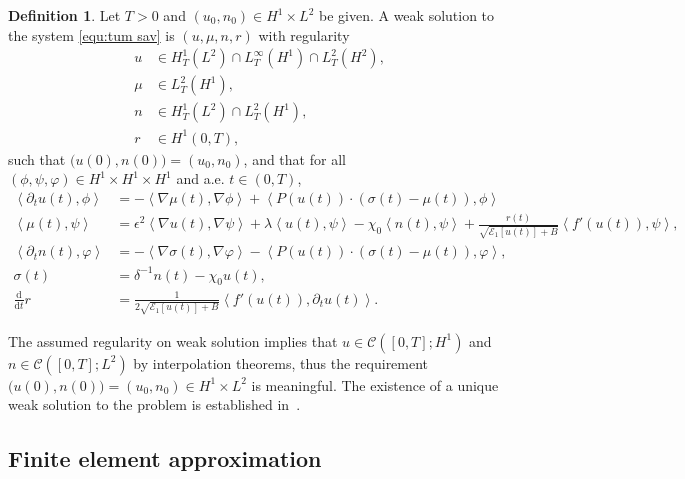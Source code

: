 \documentclass[11pt, reqno]{amsart}
\theoremstyle{definition}
\newtheorem{definition}[theorem]{Definition}
\numberwithin{equation}{section}
\newcommand{\ddt}{\frac{\mathrm{d}}{\mathrm{d}t}}
\newcommand{\inpro}[2]{\left\langle#1,#2\right\rangle}
\begin{document}
\begin{definition}\label{def:weak-solution}
Let $T>0$ and $(u_0,n_0)\in H^1\times L^2$ be given. A weak solution to the system \eqref{equ:tum sav} is $(u,\mu,n,r)$ with regularity
\begin{align*}
	u &\in H^1_T(L^2) \cap L^\infty_T(H^1) \cap L^2_T(H^2),
	\\
	\mu &\in L^2_T(H^1),
	\\
	n &\in H^1_T(L^2) \cap L^2_T(H^1),
	\\
	r &\in H^1(0,T),
\end{align*}
such that $\big(u(0),n(0)\big)=(u_0,n_0)$, and that for all $(\phi, \psi, \varphi) \in H^1\times H^1\times H^1$ and {a.e.} $t\in (0,T)$,
\begin{subequations}\label{equ:weak tum}
	\begin{alignat}{1}
		\label{equ:weak tum u}
		\inpro{\partial_t u(t)}{\phi}
		&=
		-\inpro{\nabla \mu(t)}{\nabla \phi}
		+
		\inpro{P(u(t))\cdot (\sigma(t) -\mu(t))}{\phi}
		\\
		\label{equ:weak tum mu}
		\inpro{\mu(t)}{\psi}
		&=
		\epsilon^2 \inpro{\nabla u(t)}{\nabla \psi}
		+
		\lambda \inpro{u(t)}{\psi}
		-
		\chi_0 \inpro{n(t)}{\psi}
		+
		\frac{r(t)}{\sqrt{\mathcal{E}_1[u(t)]+B}} \inpro{f'(u(t))}{\psi},
		\\
		\label{equ:weak tum n}
		\inpro{\partial_t n(t)}{\varphi}
		&=
		-\inpro{\nabla \sigma(t)}{\nabla \varphi}
		-
		\inpro{P(u(t))\cdot (\sigma(t) -\mu(t))}{\varphi},
		\\
		\label{equ:weak tum sigma}
		\sigma(t)
		&=
		\delta^{-1} n(t)
		-
		\chi_0 u(t), 
		\\
		\label{equ:weak tum r}
		\ddt r
		&=
		\frac{1}{2\sqrt{\mathcal{E}_1[u(t)]+B}}
		\inpro{f'(u(t))}{\partial_t u(t)}.
	\end{alignat}
\end{subequations}
\end{definition}
The assumed regularity on weak solution implies that $u\in \mathcal{C}([0,T];H^1)$ and $n\in \mathcal{C}([0,T];L^2)$ by interpolation theorems, thus the requirement $\big(u(0),n(0)\big)=(u_0,n_0)\in H^1\times L^2$ is meaningful. {The existence of a unique weak solution to the problem is established in~\cite{FriGraRoc15}.}


\subsection{Finite element approximation}
\end{document}
